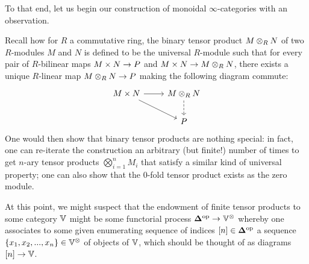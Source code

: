             To that end, let us begin our construction of monoidal $\infty$-categories with an observation.
            \begin{remark} \label{remark: monoidal_op_fibrations}
                Recall how for $R$ a commutative ring, the binary tensor product $M \tensor_R N$ of two $R$-modules $M$ and $N$ is defined to be the universal $R$-module such that for every pair of $R$-bilinear maps $M \x N \to P$ and $M \x N \to M \tensor_R N$, there exists a unique $R$-linear map $M \tensor_R N \to P$ making the following diagram commute:
                    $$
                        \begin{tikzcd}
                        	{M \x N} & {M \tensor_R N} \\
                        	& P
                        	\arrow[from=1-1, to=1-2]
                        	\arrow[dashed, from=1-2, to=2-2]
                        	\arrow[from=1-1, to=2-2]
                        \end{tikzcd}
                    $$
                One would then show that binary tensor products are nothing special: in fact, one can re-iterate the construction an arbitrary (but finite!) number of times to get $n$-ary tensor products $\bigotimes_{i = 1}^n M_i$ that satisfy a similar kind of universal property; one can also show that the $0$-fold tensor product exists as the zero module. 
                
                At this point, we might suspect that the endowment of finite tensor products to some category $\mathbb{V}$ might be some functorial process $\simp^{\op} \to \V^{\tensor}$ whereby one associates to some given enumerating sequence of indices $[n] \in \mathbf{\Delta}^{\mathrm{op}}$ a sequence $\{x_1, x_2, ..., x_n\} \in \V^{\tensor}$ of objects of $\mathbb{V}$, which should be thought of as diagrams $[n] \to \mathbb{V}$.
            \end{remark}
            
